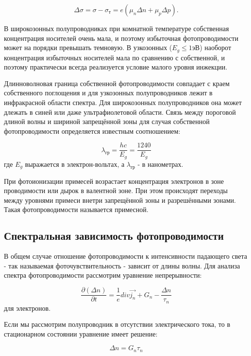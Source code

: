 \begin{equation}
\Delta \sigma = \sigma - \sigma_{\text{т}} = e (\mu_{n} \Delta n + \mu_{p} \Delta p).
\end{equation}

В широкозонных полупроводниках при комнатной температуре собственная концентрация носителей очень мала, и поэтому избыточная фотопроводимости может на порядки превышать темновую. В узкозонных ($E_{g} \le 1 \text{эВ}$) наоборот концентрация избыточных носителей мала по сравнению с собственной, и поэтому практически всегда реализуется условие малого уровня инжекции.

Длинноволновая граница собственной фотопроводимости совпадает с краем собственного поглощения и для узкозонных полупроводников лежит в инфракрасной области спектра. Для широкозонных полупроводников она может длежать в синей или даже ультрафиолетовой области. Связь между пороговой длиной волны и шириной запрещённой зоны для случая собственной фотопроводимости определяется известным соотношением:

\begin{equation}
\lambda_{\text{гр}} = \frac{h c}{E_{g}} = \frac{1240}{E_{g}}
\end{equation}
где $E_{g}$ выражается в электрон-вольтах, а $\lambda_{\text{гр}}$ - в нанометрах.

При фотоионизации примесей возрастает концентрация электронов в зоне проводимости или дырок в валентной зоне. При этом происходят переходы между уровнями примеси внетри запрещённой зоны и разрешёнными зонами. Такая фотопроводимости называется примесной.

\subsection{Спектральная зависимость фотопроводимости}
В общем случае отношение фотопроводимости к интенсивности падающего света - так называемая фоточувствительность - зависит от длины волны. Для анализа спектра фотопроводимости рассмотрим уравнение непрерывности:

\begin{equation}
\frac{\partial (\Delta n)}{\partial t} = \frac{1}{e} div \overrightarrow{j_{n}} + G_{n} - \frac{\Delta n}{\tau_{n}}
\end{equation}
для электронов.

Если мы рассмотрим полупроводник в отсутствии электрического тока, то в стационарном состоянии уравнение имеет решение:

\begin{equation}
\Delta n = G_{n} \tau_{n}
\end{equation}

